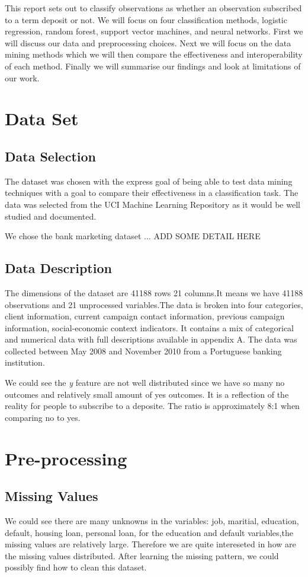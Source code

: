 \documentclass[a4paper, oneside, 11pt]{article}
\begin{document}
This report sets out to classify observations as whether an observation subscribed to a term deposit or not. We will focus on four classification methods, logistic regression, random forest, support vector machines, and neural networks. First we will discuss our data and preprocessing choices. Next we will focus on the data mining methods which we will then compare the effectiveness and interoperability of each method. Finally we will summarise our findings and look at limitations of our work.  


\section{Data Set}
\subsection{Data Selection}
The dataset was chosen with the express goal of being able to test data mining techniques with a goal to compare their effectiveness in a classification task. The data was selected from the UCI Machine Learning Repository as it would be well studied and documented.

We chose the bank marketing dataset ... ADD SOME DETAIL HERE

\subsection{Data Description}
The dimensions of the dataset are  41188 rows 21 columns.It means we have 41188 observations and 21 unprocessed variables.The data is broken into four categories, client information, current campaign contact information, previous campaign information, social-economic context indicators. It contains a mix of categorical and numerical data with full descriptions available in appendix A. The data was collected between May 2008 and November 2010 from a Portuguese banking institution.

We could see the \textit{y} feature are not well distributed since we have so many no outcomes and relatively small amount of yes outcomes. It is a reflection of the reality for people to subscribe to a deposite. The ratio is approximately 8:1 when comparing no to yes. 

\section{Pre-processing}
\subsection{Missing Values}
We could see there are many unknowns in the variables: job, maritial, education, default, housing loan, personal loan, for the education and default variables,the missing values are relatively large. Therefore we are quite intereseted in how are the missing values distributed. After learning the missing pattern, we could possibly find how to clean this dataset.
\end{document}
